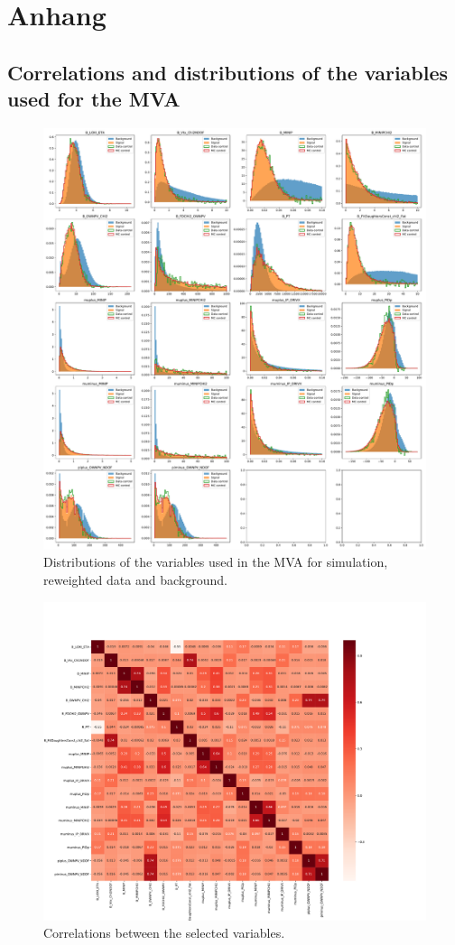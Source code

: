 \section{Anhang}
\label{sec:Anhang}
\subsection{Correlations and distributions of the variables used for the MVA}
\label{sec:Appendix1}
\centering



\begin{figure}
    \centering
    \includegraphics[width = .9\textwidth]{"content/plots/all_variables.pdf"}
    \caption{Distributions of the variables used in the MVA for simulation, reweighted data and background.}
    \label{fig:all_variables}
\end{figure}

\begin{figure}
    \centering
    \includegraphics[width = \textwidth]{"content/plots/correlations.pdf"}
    \caption{Correlations between the selected variables.}
    \label{fig:correlations}
  \end{figure}

